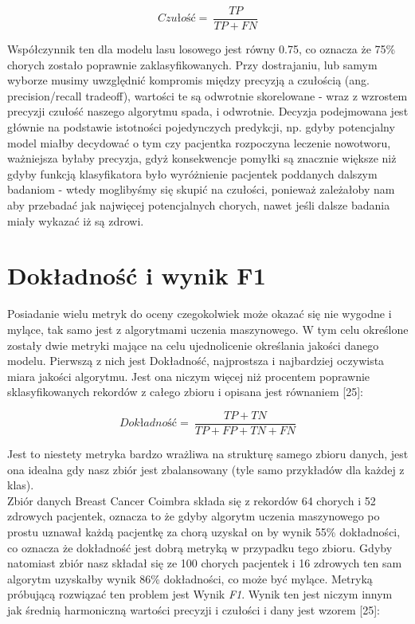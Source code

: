 \documentclass[a4paper,12pt,oneside]{book}
\begin{document}
\begin{equation}
Czu\textrm{\l}o\textrm{\'{s}}\textrm{\'{c}}=\ \frac{TP}{TP+FN}    
\end{equation}


Współczynnik ten dla modelu lasu losowego jest równy 0.75, co oznacza że 75\% chorych zostało poprawnie zaklasyfikowanych.
Przy dostrajaniu, lub samym wyborze musimy uwzględnić kompromis między precyzją a czułością (ang. precision/recall tradeoff), wartości te są odwrotnie skorelowane - wraz z wzrostem precyzji czułość naszego algorytmu spada, i odwrotnie. Decyzja podejmowana jest głównie na podstawie istotności pojedynczych predykcji, np. gdyby potencjalny model miałby decydować o tym czy pacjentka rozpoczyna leczenie nowotworu, ważniejsza byłaby precyzja, gdyż konsekwencje pomyłki są znacznie większe niż gdyby funkcją klasyfikatora było wyróżnienie pacjentek poddanych dalszym badaniom - wtedy moglibyśmy się skupić na czułości, ponieważ zależałoby nam aby przebadać jak najwięcej potencjalnych chorych, nawet jeśli dalsze badania miały wykazać iż są zdrowi.


\section{Dokładność i wynik F1}

Posiadanie wielu metryk do oceny czegokolwiek może okazać się nie wygodne i mylące, tak samo jest z algorytmami uczenia maszynowego. W tym celu określone zostały dwie metryki mające na celu ujednolicenie określania jakości danego modelu. Pierwszą z nich jest Dokładność, najprostsza i najbardziej oczywista miara jakości algorytmu. Jest ona niczym więcej niż procentem poprawnie sklasyfikowanych rekordów z całego zbioru i opisana jest równaniem [25]:

\begin{equation}
Dok\textrm{\l}adno\textrm{\'{s}}\textrm{\'{c}}=\ \frac{TP+TN}{TP+FP+TN+FN}    
\end{equation}


Jest to niestety metryka bardzo wrażliwa na strukturę samego zbioru danych, jest ona idealna gdy nasz zbiór jest zbalansowany (tyle samo przykładów dla każdej z klas).\\
Zbiór danych Breast Cancer Coimbra składa się z rekordów 64 chorych i 52 zdrowych pacjentek, oznacza to że gdyby algorytm uczenia maszynowego po prostu uznawał każdą pacjentkę za chorą uzyskał on by wynik 55\% dokładności, co oznacza że dokładność jest dobrą metryką w przypadku tego zbioru. Gdyby natomiast zbiór nasz składał się ze 100 chorych pacjentek i 16 zdrowych ten sam algorytm uzyskałby wynik 86\% dokładności, co może być mylące.
Metryką próbującą rozwiązać ten problem jest Wynik \textit{F1}. Wynik ten jest niczym innym jak średnią harmoniczną wartości precyzji i czułości i dany jest wzorem [25]:
\end{document}
